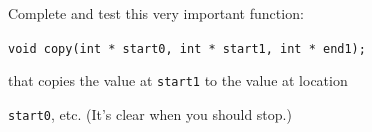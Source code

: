Complete and test this very important function:



\verb!void copy(int * start0, int * start1, int * end1);!



that copies the value at \texttt{start1} to the value at location

\texttt{start0}, etc. (It's clear when you should stop.)

